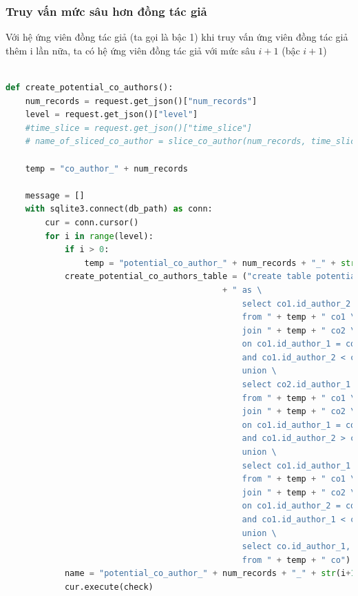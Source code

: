 \documentclass{article}
\begin{document}
\subsubsection{Truy vấn mức sâu hơn đồng tác giả}

\indent Với hệ ứng viên đồng tác giả (ta gọi là bậc 1) khi truy vấn ứng viên đồng tác giả thêm i lần nữa, ta có hệ ứng viên đồng tác giả với mức sâu $i + 1$ (bậc $i + 1$)

\begin{lstlisting}[language=Python, caption=Truy vấn mức sâu đồng tác giả]

def create_potential_co_authors():
    num_records = request.get_json()["num_records"]
    level = request.get_json()["level"]
    #time_slice = request.get_json()["time_slice"]
    # name_of_sliced_co_author = slice_co_author(num_records, time_slice)

    temp = "co_author_" + num_records

    message = []
    with sqlite3.connect(db_path) as conn:
        cur = conn.cursor()
        for i in range(level):
            if i > 0:
                temp = "potential_co_author_" + num_records + "_" + str(i)
            create_potential_co_authors_table = ("create table potential_co_author_" + num_records + "_" + str(i+1) 
                                            + " as \
                                                select co1.id_author_2 as id_author_1, co2.id_author_2 as id_author_2 \
                                                from " + temp + " co1 \
                                                join " + temp + " co2 \
                                                on co1.id_author_1 = co2.id_author_1 \
                                                and co1.id_author_2 < co2.id_author_2 \
                                                union \
                                                select co2.id_author_1 as id_author_1, co1.id_author_2 as id_author_2 \
                                                from " + temp + " co1 \
                                                join " + temp + " co2 \
                                                on co1.id_author_1 = co2.id_author_2 \
                                                and co1.id_author_2 > co2.id_author_1 \
                                                union \
                                                select co1.id_author_1 as id_author_1, co2.id_author_1 as id_author_2 \
                                                from " + temp + " co1 \
                                                join " + temp + " co2 \
                                                on co1.id_author_2 = co2.id_author_2 \
                                                and co1.id_author_1 < co2.id_author_1 \
                                                union \
                                                select co.id_author_1, co.id_author_2 \
                                                from " + temp + " co")
            name = "potential_co_author_" + num_records + "_" + str(i+1)
            cur.execute(check)


\end{lstlisting}
\end{document}
